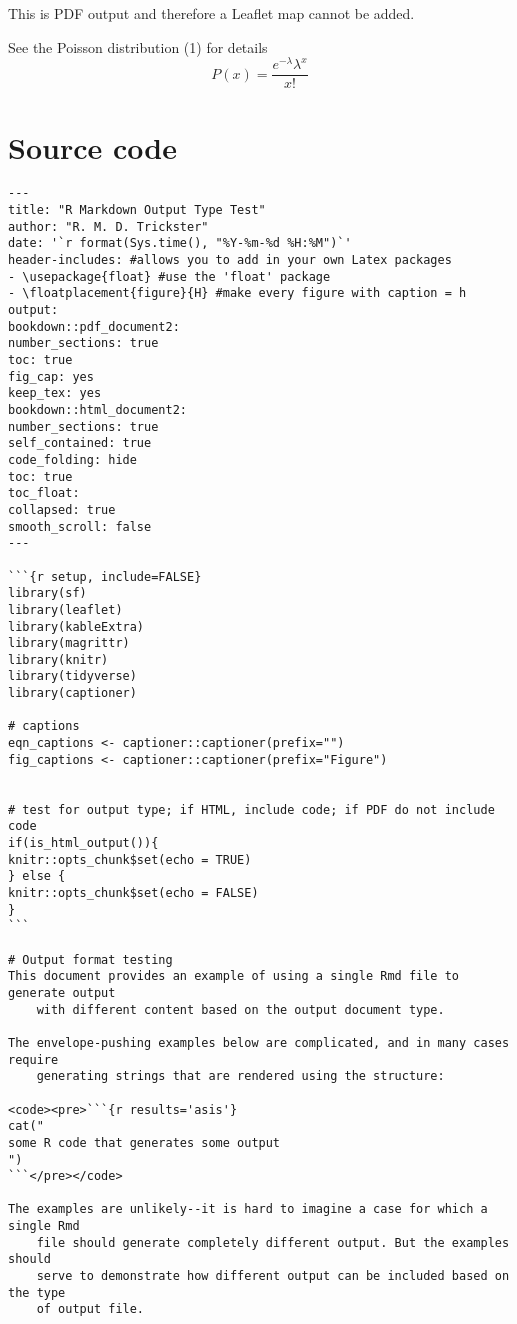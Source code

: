 \documentclass[
]{article}
\begin{document}
This is PDF output and therefore a Leaflet map cannot be added.

See the Poisson distribution (1) for details
\begin{equation}
      P\left( x \right) = \frac{{e^{ - \lambda } \lambda ^x }}{{x!}}
    \end{equation}

\hypertarget{source-code}{%
\section{Source code}\label{source-code}}

\begin{verbatim}
---
title: "R Markdown Output Type Test"
author: "R. M. D. Trickster"
date: '`r format(Sys.time(), "%Y-%m-%d %H:%M")`'
header-includes: #allows you to add in your own Latex packages
- \usepackage{float} #use the 'float' package
- \floatplacement{figure}{H} #make every figure with caption = h
output:
bookdown::pdf_document2:
number_sections: true
toc: true
fig_cap: yes
keep_tex: yes
bookdown::html_document2:
number_sections: true
self_contained: true
code_folding: hide
toc: true
toc_float:
collapsed: true
smooth_scroll: false
---

```{r setup, include=FALSE}
library(sf)
library(leaflet)
library(kableExtra)
library(magrittr)
library(knitr)
library(tidyverse)
library(captioner)

# captions
eqn_captions <- captioner::captioner(prefix="")
fig_captions <- captioner::captioner(prefix="Figure")


# test for output type; if HTML, include code; if PDF do not include code
if(is_html_output()){
knitr::opts_chunk$set(echo = TRUE)
} else {
knitr::opts_chunk$set(echo = FALSE)
}
```

# Output format testing
This document provides an example of using a single Rmd file to generate output
    with different content based on the output document type.

The envelope-pushing examples below are complicated, and in many cases require
    generating strings that are rendered using the structure:

<code><pre>```{r results='asis'}
cat("
some R code that generates some output
")
```</pre></code>

The examples are unlikely--it is hard to imagine a case for which a single Rmd
    file should generate completely different output. But the examples should
    serve to demonstrate how different output can be included based on the type
    of output file.


\end{verbatim}
\end{document}
